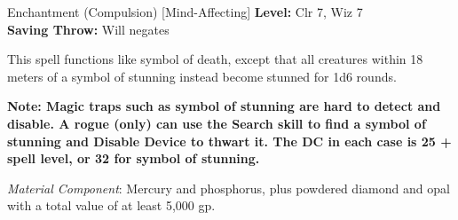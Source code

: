 {Enchantment (Compulsion) [Mind-Affecting]}
{
	\textbf{Level:}
	Clr 7, Wiz 7\\
	\textbf{Saving Throw:}
	Will negates\\
}
{
	This spell functions like symbol of death, except that all creatures within 18 meters of a symbol of stunning instead become stunned for 1d6 rounds.

	\textbf{Note: Magic traps such as symbol of stunning are hard to detect and disable. A rogue (only) can use the Search skill to find a symbol of stunning and Disable Device to thwart it. The DC in each case is 25 + spell level, or 32 for symbol of stunning.}

	\textit{Material Component}:
	Mercury and phosphorus, plus powdered diamond and opal with a total value of at least 5,000 gp.

}
